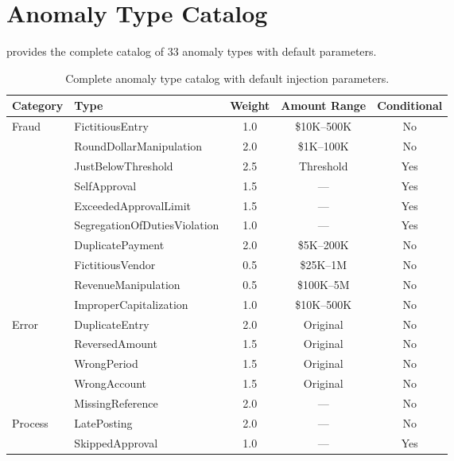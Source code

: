 \section{Anomaly Type Catalog}
\label{app:anomaly_catalog}

 provides the complete catalog of 33
anomaly types with default parameters.

\begin{table}[H]
\centering
\caption{Complete anomaly type catalog with default injection parameters.}
\label{tab:full_anomaly_catalog}
\small
\begin{tabular}{llccc}
\toprule
\textbf{Category} & \textbf{Type} & \textbf{Weight}
  & \textbf{Amount Range} & \textbf{Conditional} \\
\midrule
\multirow{7}{*}{Fraud}
  & FictitiousEntry              & 1.0 & \$10K--500K & No \\
  & RoundDollarManipulation      & 2.0 & \$1K--100K  & No \\
  & JustBelowThreshold           & 2.5 & Threshold   & Yes \\
  & SelfApproval                 & 1.5 & ---         & Yes \\
  & ExceededApprovalLimit        & 1.5 & ---         & Yes \\
  & SegregationOfDutiesViolation & 1.0 & ---         & Yes \\
  & DuplicatePayment             & 2.0 & \$5K--200K  & No \\
\cmidrule{2-5}
  & FictitiousVendor             & 0.5 & \$25K--1M   & No \\
  & RevenueManipulation          & 0.5 & \$100K--5M  & No \\
  & ImproperCapitalization       & 1.0 & \$10K--500K & No \\
\midrule
\multirow{5}{*}{Error}
  & DuplicateEntry               & 2.0 & Original    & No \\
  & ReversedAmount               & 1.5 & Original    & No \\
  & WrongPeriod                  & 1.5 & Original    & No \\
  & WrongAccount                 & 1.5 & Original    & No \\
  & MissingReference             & 2.0 & ---         & No \\
\midrule
\multirow{3}{*}{Process}
  & LatePosting                  & 2.0 & ---         & No \\
  & SkippedApproval              & 1.0 & ---         & Yes \\

\end{tabular}
\end{table}
